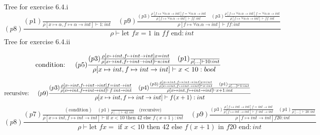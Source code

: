 \documentclass[]{report}
\begin{document}
Tree for exercise 6.4.i
\begin{equation*}
(p8)
\frac{
	(p1)
	\frac{
	}
	{
		\rho [x \mapsto \alpha ,f \mapsto \alpha \to int] \vdash 1:int
	}
	\quad
	(p9)
	\frac
	{
		(p3)
		\frac{
			\rho [f \mapsto \forall \alpha . \alpha \to int ] f = \forall \alpha . \alpha \to int
		}
		{
			\rho [f \mapsto \forall \alpha . \alpha \to int ] \vdash f f: int
		}
		\quad
		(p3)
		\frac{
			\rho [f \mapsto \forall \alpha . \alpha \to int ] f = \forall \alpha . \alpha \to int
		}
		{
			\rho [f \mapsto \forall \alpha . \alpha \to int ] \vdash f f: int
		}
	}
	{
		\rho [f \mapsto \forall \alpha . \alpha \to int ] \vdash ff:int 
	}
}
{
	\rho \vdash \text{let } f x = 1 \text{ in } f f \text{ end}:int
}
\end{equation*}
Tree for exercise 6.4.ii

\begin{equation*}
\text {condition: \quad}
(p5)
\frac{
	(p3)
	\frac{
		\rho [x \mapsto int, f \mapsto int \to int] x = int
	}
	{
		\rho [x \mapsto int, f \mapsto int \to int] \vdash n : int
	} 
	\quad
	(p1) 
	\frac{
	}
	{
		\rho [...] \vdash 10:int
	}
}
{
	\rho [x \mapsto int, f \mapsto int \to int] \vdash x < 10:bool
}
\end{equation*}

\begin{equation*}
\text{recursive: \quad}
(p9)
\frac{
	(p3)
	\frac{
		\rho [x \mapsto int, f \mapsto int \to int] f = int \to int
	}
	{
		\rho [x \mapsto int, f \mapsto int \to int] \vdash f : int \to int
	}
	 \quad
	(p4)
	 \frac{
		(p3)
		\frac{
			\rho [x \mapsto int, f \mapsto int \to int] x = int
		}
		{
			\rho [x \mapsto int, f \mapsto int \to int] \vdash x:int
		} 
		\quad
		(p1) 
		\frac{}
		{
			\rho [...] \vdash 1:int
		}
	}
	{
		\rho [x \mapsto int, f \mapsto int \to int] \vdash x + 1:int
	}
}
{
	\rho [x \mapsto int, f \mapsto int \to int] \vdash f(x+1):int
}
\end{equation*}
\begin{equation*}
(p8)
\frac{
	(p7)
	\frac{ 
		(\text{condition}) 
		\quad
		(p1)
		 \frac{}
		{
			\rho [...] \vdash 42 : int
		}
		\quad
		\text{(recursive})
	}
	{
		\rho [x \mapsto int, f \mapsto int \to int] \vdash \text{if } x < 10 \text{ then } 42 \text{ else } f(x+1):int
	}
	\quad
	(p9)
	\frac{
		(p3)
		\frac{
			\rho [f \mapsto int \to int] f = int \to int
		}
		{
			\rho [f \mapsto int \to int] \vdash f : int \to int
		} 
		\quad
		(p1)
		\frac{}
		{
			\rho [...] \vdash 20:int
		}
	}
	{
		\rho [f \mapsto int \to int] f 20 : int
	}
}
{
	\rho \vdash \text{let } f x = \text{ if } x < 10 \text{ then } 42 \text{ else } f(x+1) \text{ in } f 20 \text{ end}:int
}
\end{equation*}
\end{document}
